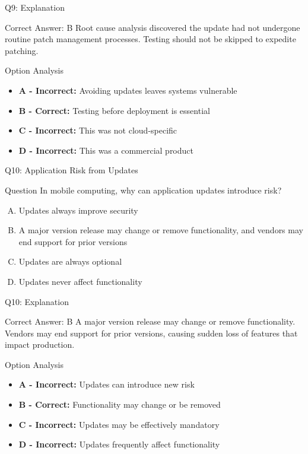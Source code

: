 \documentclass{beamer}
\begin{document}
	\begin{frame}{Q9: Explanation}
		\begin{block}{Correct Answer: B}
			Root cause analysis discovered the update had not undergone routine patch management processes. Testing should not be skipped to expedite patching.
		\end{block}
		\begin{block}{Option Analysis}
			\begin{itemize}
				\item \textbf{A - Incorrect:} Avoiding updates leaves systems vulnerable
				\item \textbf{B - Correct:} Testing before deployment is essential
				\item \textbf{C - Incorrect:} This was not cloud-specific
				\item \textbf{D - Incorrect:} This was a commercial product
			\end{itemize}
		\end{block}
	\end{frame}
	
	\begin{frame}{Q10: Application Risk from Updates}
		\begin{block}{Question}
			In mobile computing, why can application updates introduce risk?
		\end{block}
		\begin{enumerate}[(A)]
			\item Updates always improve security
			\item A major version release may change or remove functionality, and vendors may end support for prior versions
			\item Updates are always optional
			\item Updates never affect functionality
		\end{enumerate}
	\end{frame}
	
	\begin{frame}{Q10: Explanation}
		\begin{block}{Correct Answer: B}
			A major version release may change or remove functionality. Vendors may end support for prior versions, causing sudden loss of features that impact production.
		\end{block}
		\begin{block}{Option Analysis}
			\begin{itemize}
				\item \textbf{A - Incorrect:} Updates can introduce new risk
				\item \textbf{B - Correct:} Functionality may change or be removed
				\item \textbf{C - Incorrect:} Updates may be effectively mandatory
				\item \textbf{D - Incorrect:} Updates frequently affect functionality
			\end{itemize}
		\end{block}
	\end{frame}
	
\end{document}
